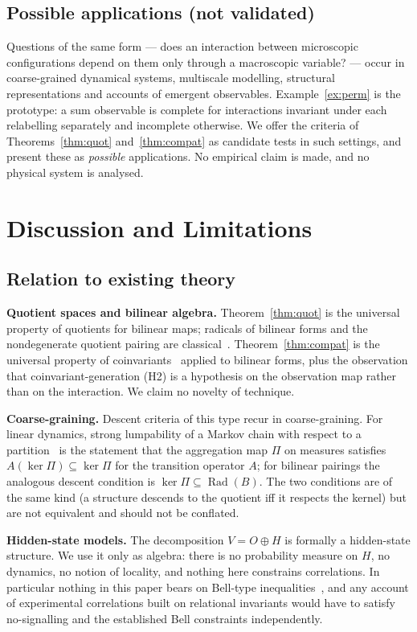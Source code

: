 \documentclass[11pt,a4paper]{article}
\newcommand{\Rad}{\operatorname{Rad}}
\theoremstyle{plain}
\theoremstyle{definition}
\begin{document}
\subsection{Possible applications (not validated)}
Questions of the same form --- does an interaction between microscopic configurations depend on them only through a macroscopic variable? --- occur in coarse-grained dynamical systems, multiscale modelling, structural representations and accounts of emergent observables. Example~\ref{ex:perm} is the prototype: a sum observable is complete for interactions invariant under each relabelling separately and incomplete otherwise. We offer the criteria of Theorems~\ref{thm:quot} and~\ref{thm:compat} as candidate tests in such settings, and present these as \emph{possible} applications. No empirical claim is made, and no physical system is analysed.

\section{Discussion and Limitations}\label{sec:discussion}

\subsection{Relation to existing theory}
\textbf{Quotient spaces and bilinear algebra.} Theorem~\ref{thm:quot} is the universal property of quotients for bilinear maps; radicals of bilinear forms and the nondegenerate quotient pairing are classical~\cite{Lan02,Rom08,Gre75}. Theorem~\ref{thm:compat} is the universal property of coinvariants~\cite{Bro82} applied to bilinear forms, plus the observation that coinvariant-generation (H2) is a hypothesis on the observation map rather than on the interaction. We claim no novelty of technique.
\par\smallskip\noindent
\textbf{Coarse-graining.} Descent criteria of this type recur in coarse-graining. For linear dynamics, strong lumpability of a Markov chain with respect to a partition~\cite{KS60} is the statement that the aggregation map $\Pi$ on measures satisfies $A(\ker\Pi)\subseteq\ker\Pi$ for the transition operator $A$; for bilinear pairings the analogous descent condition is $\ker\Pi\subseteq\Rad(B)$. The two conditions are of the same kind (a structure descends to the quotient iff it respects the kernel) but are not equivalent and should not be conflated.
\par\smallskip\noindent
\textbf{Hidden-state models.} The decomposition $V=O\oplus H$ is formally a hidden-state structure. We use it only as algebra: there is no probability measure on $H$, no dynamics, no notion of locality, and nothing here constrains correlations. In particular nothing in this paper bears on Bell-type inequalities~\cite{Bel64,CHSH69,Tsi80}, and any account of experimental correlations built on relational invariants would have to satisfy no-signalling and the established Bell constraints independently.
\end{document}
